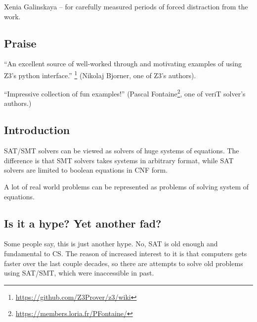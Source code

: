 Xenia Galinskaya -- for carefully measured periods of forced distraction from the work.

\subsection{Praise}

``An excellent source of well-worked through and motivating examples of using Z3's python interface.''
\footnote{\url{https://github.com/Z3Prover/z3/wiki}}
(Nikolaj Bjorner, one of Z3's authors).

``Impressive collection of fun examples!''
(Pascal Fontaine\footnote{\url{https://members.loria.fr/PFontaine/}}, one of veriT solver's authors.)

\subsection{Introduction}

\ac{SAT}/\ac{SMT} solvers can be viewed as solvers of huge systems of equations.
The difference is that \ac{SMT} solvers takes systems in arbitrary format,
while \ac{SAT} solvers are limited to boolean equations in \ac{CNF} form.

A lot of real world problems can be represented as problems of solving system of equations.

\subsection{Is it a hype? Yet another fad?}

Some people say, this is just another hype.
No, \ac{SAT} is old enough and fundamental to \ac{CS}.
The reason of increased interest to it is that computers gets faster over the last couple decades,
so there are attempts to solve old problems using \ac{SAT}/\ac{SMT}, which were inaccessible in past.

